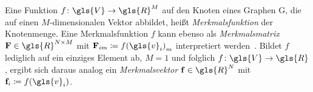 Eine Funktion $f \colon \gls{V} \to \gls{R}^M$ auf den Knoten eines Graphen \gls{G}, die auf einen $M$-dimensionalen Vektor abbildet, heißt \emph{Merkmalsfunktion} der Knotenmenge.
Eine Merkmalsfunktion $f$ kann ebenso als \emph{Merkmalsmatrix} $\ma{F} \in \gls{R}^{N \times M}$ mit $ \ma{F}_{im} \coloneqq {f\left(\gls{v}_i\right)}_m$ interpretiert werden~\cite{Shuman}.
Bildet $f$ lediglich auf ein einziges Element ab, \dhe{} $M=1$ und folglich $f \colon \gls{V} \to \gls{R}$, ergibt sich daraus analog ein \emph{Merkmalsvektor} $\ve{f} \in \gls{R}^N$ mit $\ve{f}_i \coloneqq f\left(\gls{v}_i\right)$.
